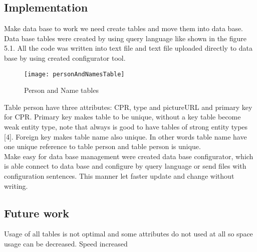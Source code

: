 \subsection{Implementation}

Make data base to work we need create tables and move them into data base. Data base tables were created by using query language like shown in the figure 5.1. All the code was written into text file and text file uploaded directly to data base by using created configurator tool.

\begin{figure}[h]
	\centering
		\texttt{[image: personAndNamesTable]}
	\caption{Person and Name tables}
	\label{fig:planning}
\end{figure}

Table person have three attributes: CPR, type and pictureURL and primary key for CPR. Primary key makes table to be unique, without a key table become weak entity type, note that always is good to have tables of strong entity types [4]. Foreign key makes table name also unique. In other words table name have one unique reference to table person and table person is unique. \\ Make easy for data base management were created data base configurator, which is able connect to data base and configure by query language or send files with configuration sentences. This manner let faster update and change without writing. 

\subsection{Future work}

Usage of all tables is not optimal and some attributes do not used at all so space usage can be decreased.
Speed increased